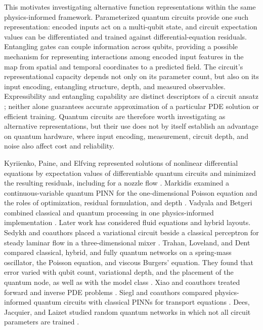 \documentclass{erdc}
\begin{document}
This motivates investigating alternative function representations within
the same physics-informed framework. Parameterized quantum circuits
provide one such representation: encoded inputs act on a multi-qubit
state, and circuit expectation values can be differentiated and trained
against differential-equation residuals. Entangling gates can couple
information across qubits, providing a possible mechanism for representing
interactions among encoded input features in the map from spatial and
temporal coordinates to a predicted field. The circuit's representational
capacity depends not only on its parameter count, but also on its input
encoding, entangling structure, depth, and measured observables.
Expressibility and entangling capability are distinct descriptors of a
circuit ansatz \cite{Sim2019}; neither alone guarantees accurate
approximation of a particular PDE solution or efficient training. Quantum
circuits are therefore worth investigating as alternative representations,
but their use does not by itself establish an advantage on quantum
hardware, where input encoding, measurement, circuit depth, and noise also
affect cost and reliability.

Kyriienko, Paine, and Elfving represented solutions of nonlinear
differential equations by expectation values of differentiable quantum
circuits and minimized the resulting residuals, including for a nozzle
flow \cite{Kyriienko2021}. Markidis examined a continuous-variable quantum
PINN for the one-dimensional Poisson equation and the roles of
optimization, residual formulation, and depth \cite{markidis2022physics}.
Vadyala and Betgeri combined classical and quantum processing in one
physics-informed implementation \cite{vadyala2023general}. Later work has
considered fluid equations and hybrid layouts. Sedykh and coauthors placed
a variational circuit beside a classical perceptron for steady laminar
flow in a three-dimensional mixer \cite{Sedykh2024}. Trahan, Loveland,
and Dent compared classical, hybrid, and fully quantum networks on a
spring-mass oscillator, the Poisson equation, and viscous Burgers'
equation. They found that error varied with qubit count, variational
depth, and the placement of the quantum node, as well as with the model
class \cite{Trahan2024}. Xiao and coauthors treated forward and inverse
PDE problems \cite{xiao2024physics}. Siegl and coauthors compared
physics-informed quantum circuits with classical PINNs for transport
equations \cite{siegl2024transport}. Dees, Jacquier, and Laizet studied
random quantum networks in which not all circuit parameters are trained
\cite{dees2024unsupervised}.
\end{document}
